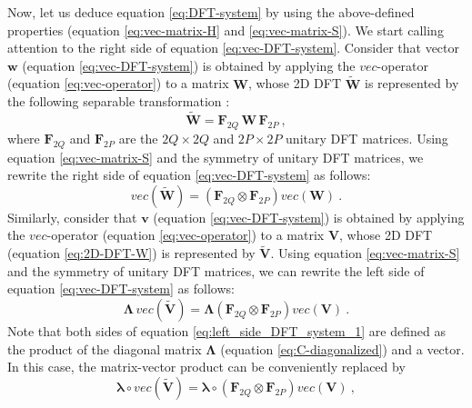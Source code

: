 Now, let us deduce equation \ref{eq:DFT-system} by 
using the above-defined properties (equation \ref{eq:vec-matrix-H}
and \ref{eq:vec-matrix-S}).
We start calling attention to the right side of equation \ref{eq:vec-DFT-system}.
Consider that vector $\mathbf{w}$ (equation \ref{eq:vec-DFT-system}) 
is obtained by applying the $vec$-operator (equation \ref{eq:vec-operator}) to a matrix 
$\mathbf{W}$, whose 2D DFT $\tilde{\mathbf{W}}$ is represented by the 
following separable transformation \citep[][ p. 146]{jain1989}:
\begin{equation}
\tilde{\mathbf{W}} = \mathbf{F}_{2Q} \, \mathbf{W} \, \mathbf{F}_{2P} \: ,
\label{eq:2D-DFT-W}
\end{equation}
where $\mathbf{F}_{2Q}$ and $\mathbf{F}_{2P}$ are the $2Q \times 2Q$ and $2P \times 2P$ 
unitary DFT matrices. 
Using equation \ref{eq:vec-matrix-S} and the symmetry of unitary DFT 
matrices, we rewrite the right side of equation \ref{eq:vec-DFT-system} 
as follows:
\begin{equation}
vec \left( \tilde{\mathbf{W}} \right) = 
\left( \mathbf{F}_{2Q} \otimes \mathbf{F}_{2P} \right) 
vec \left( \mathbf{W} \right) \: .
\label{eq:right_side_DFT_system_1}
\end{equation}
Similarly, consider that $\mathbf{v}$ (equation \ref{eq:vec-DFT-system}) 
is obtained by applying the $vec$-operator (equation \ref{eq:vec-operator}) to a matrix 
$\mathbf{V}$, whose 2D DFT (equation \ref{eq:2D-DFT-W}) is 
represented by $\tilde{\mathbf{V}}$. Using equation \ref{eq:vec-matrix-S} and the symmetry 
of unitary DFT matrices, we can rewrite the 
left side of equation \ref{eq:vec-DFT-system} as follows:
\begin{equation}
\boldsymbol{\Lambda} \, vec \left( \tilde{\mathbf{V}} \right) = 
\boldsymbol{\Lambda}
\left( \mathbf{F}_{2Q} \otimes \mathbf{F}_{2P} \right) 
vec \left( \mathbf{V} \right) \: .
\label{eq:left_side_DFT_system_1}
\end{equation}
Note that both sides of equation \ref{eq:left_side_DFT_system_1}
are defined as the product of the diagonal matrix $\boldsymbol{\Lambda}$ (equation \ref{eq:C-diagonalized}) 
and a vector. In this case, the matrix-vector product can be conveniently replaced by
\begin{equation}
\boldsymbol{\lambda} \circ vec \left( \tilde{\mathbf{V}} \right) = 
\boldsymbol{\lambda} \circ
\left( \mathbf{F}_{2Q} \otimes \mathbf{F}_{2P} \right) 
vec \left( \mathbf{V} \right) \: ,
\label{eq:left_side_DFT_system_2}
\end{equation}
